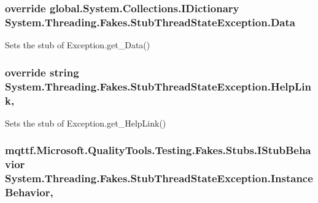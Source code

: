 \hypertarget{class_system_1_1_threading_1_1_fakes_1_1_stub_thread_state_exception_ac09af225109cb8294328f4a8cd414466}{
\subsubsection[{Data}]{\setlength{\rightskip}{0pt plus 5cm}override global.\-System.\-Collections.\-I\-Dictionary System.\-Threading.\-Fakes.\-Stub\-Thread\-State\-Exception.\-Data\hspace{0.3cm}{\ttfamily [get]}}}\label{class_system_1_1_threading_1_1_fakes_1_1_stub_thread_state_exception_ac09af225109cb8294328f4a8cd414466}


Sets the stub of Exception.\-get\-\_\-\-Data()

\hypertarget{class_system_1_1_threading_1_1_fakes_1_1_stub_thread_state_exception_adb3ca649adf74a7adcbfc7c8c2edeb3d}{
\subsubsection[{Help\-Link}]{\setlength{\rightskip}{0pt plus 5cm}override string System.\-Threading.\-Fakes.\-Stub\-Thread\-State\-Exception.\-Help\-Link\hspace{0.3cm}{\ttfamily [get]}, {\ttfamily [set]}}}\label{class_system_1_1_threading_1_1_fakes_1_1_stub_thread_state_exception_adb3ca649adf74a7adcbfc7c8c2edeb3d}


Sets the stub of Exception.\-get\-\_\-\-Help\-Link()

\hypertarget{class_system_1_1_threading_1_1_fakes_1_1_stub_thread_state_exception_aa03ae5dd592d2f77f55c71e5d22dcb29}{
\subsubsection[{Instance\-Behavior}]{\setlength{\rightskip}{0pt plus 5cm}mqttf.\-Microsoft.\-Quality\-Tools.\-Testing.\-Fakes.\-Stubs.\-I\-Stub\-Behavior System.\-Threading.\-Fakes.\-Stub\-Thread\-State\-Exception.\-Instance\-Behavior\hspace{0.3cm}{\ttfamily [get]}, {\ttfamily [set]}}}\label{class_system_1_1_threading_1_1_fakes_1_1_stub_thread_state_exception_aa03ae5dd592d2f77f55c71e5d22dcb29}


